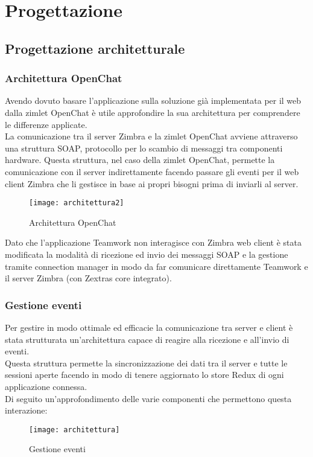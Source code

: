 \chapter{Progettazione}\label{chap:design}

\section {Progettazione architetturale}
\subsection{Architettura OpenChat}
Avendo dovuto basare l'applicazione sulla soluzione già implementata per il web dalla zimlet OpenChat è utile approfondire la sua architettura per comprendere le differenze applicate. \\
La comunicazione tra il server Zimbra e la zimlet OpenChat avviene attraverso una struttura SOAP, protocollo per lo scambio di messaggi tra componenti hardware.
Questa struttura, nel caso della zimlet OpenChat, permette la comunicazione con il server indirettamente facendo passare gli eventi per il web client Zimbra che li gestisce in base ai propri bisogni prima di inviarli al server. \\
\begin{figure}[H] 
	\centering
	\texttt{[image: architettura2]}
	\caption{Architettura OpenChat}
\end{figure}
Dato che l'applicazione Teamwork non interagisce con Zimbra web client è stata modificata la modalità di ricezione ed invio dei messaggi SOAP e la gestione tramite connection manager in modo da far comunicare direttamente Teamwork e il server Zimbra (con Zextras core integrato).

\subsection{Gestione eventi}
Per gestire in modo ottimale ed efficacie la comunicazione tra server e client è stata strutturata un'architettura capace di reagire alla ricezione e all'invio di eventi. \\
Questa struttura permette la sincronizzazione dei dati tra il server e tutte le sessioni aperte facendo in modo di tenere aggiornato lo store Redux di ogni applicazione connessa.\\
Di seguito un'approfondimento delle varie componenti che permettono questa interazione:
\begin{figure}[H] 
	\centering
	\texttt{[image: architettura]}
	\caption{Gestione eventi}
\end{figure}
